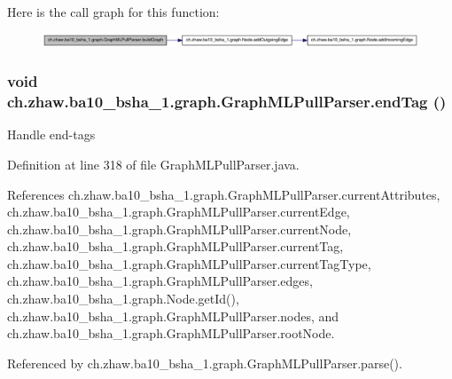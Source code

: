 Here is the call graph for this function:\nopagebreak
\begin{figure}[H]
\begin{center}
\leavevmode
\includegraphics[width=420pt]{classch_1_1zhaw_1_1ba10__bsha__1_1_1graph_1_1GraphMLPullParser_a5725aeb6453b75f4a0e7166bf4fe1023_cgraph}
\end{center}
\end{figure}
\hypertarget{classch_1_1zhaw_1_1ba10__bsha__1_1_1graph_1_1GraphMLPullParser_ae57851701120dd3a6c241c4057f88f34}{
\subsubsection[{endTag}]{\setlength{\rightskip}{0pt plus 5cm}void ch.zhaw.ba10\_\-bsha\_\-1.graph.GraphMLPullParser.endTag ()}}
\label{classch_1_1zhaw_1_1ba10__bsha__1_1_1graph_1_1GraphMLPullParser_ae57851701120dd3a6c241c4057f88f34}
Handle end-\/tags 

Definition at line 318 of file GraphMLPullParser.java.

References ch.zhaw.ba10\_\-bsha\_\-1.graph.GraphMLPullParser.currentAttributes, ch.zhaw.ba10\_\-bsha\_\-1.graph.GraphMLPullParser.currentEdge, ch.zhaw.ba10\_\-bsha\_\-1.graph.GraphMLPullParser.currentNode, ch.zhaw.ba10\_\-bsha\_\-1.graph.GraphMLPullParser.currentTag, ch.zhaw.ba10\_\-bsha\_\-1.graph.GraphMLPullParser.currentTagType, ch.zhaw.ba10\_\-bsha\_\-1.graph.GraphMLPullParser.edges, ch.zhaw.ba10\_\-bsha\_\-1.graph.Node.getId(), ch.zhaw.ba10\_\-bsha\_\-1.graph.GraphMLPullParser.nodes, and ch.zhaw.ba10\_\-bsha\_\-1.graph.GraphMLPullParser.rootNode.

Referenced by ch.zhaw.ba10\_\-bsha\_\-1.graph.GraphMLPullParser.parse().

